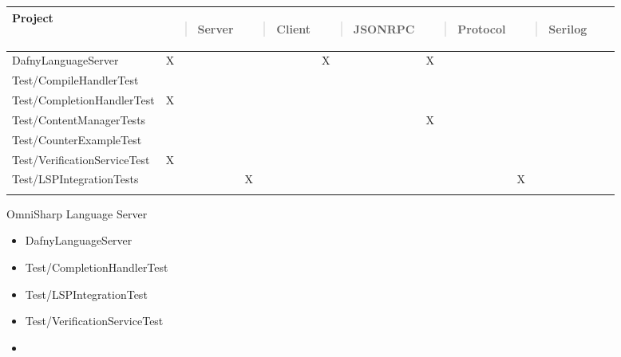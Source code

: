 \documentclass[]{book}
\begin{document}
\begin{longtable}[]{@{}llllllll@{}}
\toprule
\begin{minipage}[b]{0.12\columnwidth}\raggedright\strut
Project\strut
\end{minipage} & \begin{minipage}[b]{0.12\columnwidth}\raggedright\strut
\begin{quote}
Server
\end{quote}\strut
\end{minipage} & \begin{minipage}[b]{0.12\columnwidth}\raggedright\strut
\begin{quote}
Client
\end{quote}\strut
\end{minipage} & \begin{minipage}[b]{0.12\columnwidth}\raggedright\strut
\begin{quote}
JSONRPC
\end{quote}\strut
\end{minipage} & \begin{minipage}[b]{0.12\columnwidth}\raggedright\strut
\begin{quote}
Protocol
\end{quote}\strut
\end{minipage} & \begin{minipage}[b]{0.12\columnwidth}\raggedright\strut
\begin{quote}
Serilog
\end{quote}\strut
\end{minipage} & \begin{minipage}[b]{0.12\columnwidth}\raggedright\strut
\strut
\end{minipage} & \begin{minipage}[b]{0.12\columnwidth}\raggedright\strut
\strut
\end{minipage}\tabularnewline
\midrule
\endhead
DafnyLanguageServer & X & & X & X & & &\tabularnewline
Test/CompileHandlerTest & & & & & & &\tabularnewline
Test/CompletionHandlerTest & X & & & & & &\tabularnewline
Test/ContentManagerTests & & & & X & & &\tabularnewline
Test/CounterExampleTest & & & & & & &\tabularnewline
Test/VerificationServiceTest & X & & & & & &\tabularnewline
Test/LSPIntegrationTests & & X & & & X & &\tabularnewline
& & & & & & &\tabularnewline
\bottomrule
\end{longtable}

OmniSharp Language Server

\begin{itemize}
\item
  DafnyLanguageServer
\item
  Test/CompletionHandlerTest
\item
  Test/LSPIntegrationTest
\item
  Test/VerificationServiceTest
\item
\end{itemize}
\end{document}
